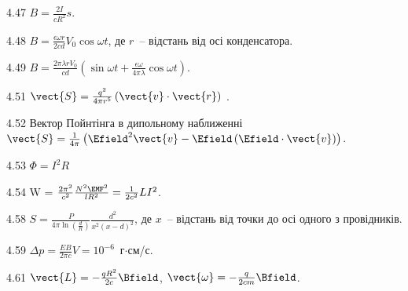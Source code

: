 \begin{Solution}{4.{47}}
	$B = \frac{2I}{cR^2}s$.
\end{Solution}
\begin{Solution}{4.{48}}
	$B = \frac{\epsilon\omega r}{2cd}V_0\cos\omega t$, де $r$~-- відстань від осі конденсатора.
\end{Solution}
\begin{Solution}{4.{49}}
	$B = \frac{2\pi\lambda r V_0}{cd}\left( \sin\omega t + \frac{\epsilon \omega}{4\pi\lambda}\cos\omega t\right) $.
\end{Solution}
\begin{Solution}{4.{51}}
	$\vect{S} = \frac{q^2}{4\pi r^5} \left( \vect{v} \cdot \vect{r}\right)$ .
\end{Solution}
\begin{Solution}{4.{52}}
	Вектор Пойнтінга в дипольному наближенні $\vect{S} = \frac{1}{4\pi} \left( \Efield^2 \vect{v} - \Efield\left(\Efield\cdot\vect{v} \right) \right) $.
\end{Solution}
\begin{Solution}{4.{53}}
	$\Phi = I^2R$
\end{Solution}
\begin{Solution}{4.{54}}
	W = $\frac{2\pi^2}{c^2} \frac{N^2\EMF^2}{lR^2} = \frac{1}{2c^2} LI^2$.
\end{Solution}
\begin{Solution}{4.{58}}
	$S  = \frac{P}{4\pi\ln\left( \frac{d}{R} \right) } \frac{d^2}{x^2\left( x - d\right)^2 }$, де $x$~-- відстань від точки до осі одного з провідників.
\end{Solution}
\begin{Solution}{4.{59}}
	$\Delta p = \frac{EB}{2\pi c}V = 10^{-6}$~г$\cdot$см/с.
\end{Solution}
\begin{Solution}{4.{61}}
    $ \vect{L} =  -\frac{q R^2}{2c}\Bfield $, $ \vect{\omega} = -\frac{q}{2c m}\Bfield $.
\end{Solution}
